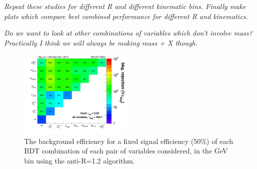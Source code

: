 {\it Repeat these studies for different R and different kinematic
bins. Finally make plots which compare best combined performance for
different R and kinematics.}

{\it Do we want to look at other combinations of variables which don't
involve mass? Practically I think we will always be making mass + X though.}


\begin{figure}
\begin{center}
\includegraphics[width=0.48\textwidth]{./Figures/WTagging/pT500/AKtR12/effBkg2D.png}
\caption{The background efficiency
for a fixed signal efficiency (50\%) of each BDT combination of
each pair of variables considered, in the  GeV bin using the anti-\kT R=1.2
algorithm.}
\label{fig:pt500_2Dcomb_AKt_R12}
\end{center}
\end{figure}

